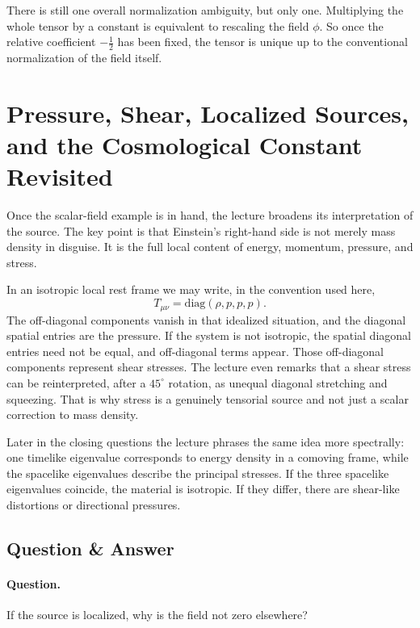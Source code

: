 There is still one overall normalization ambiguity, but only one. Multiplying the whole tensor by a constant is equivalent to rescaling the field \(\phi\). So once the relative coefficient \(-\frac12\) has been fixed, the tensor is unique up to the conventional normalization of the field itself.

\section{Pressure, Shear, Localized Sources, and the Cosmological Constant Revisited}

Once the scalar-field example is in hand, the lecture broadens its interpretation of the source. The key point is that Einstein's right-hand side is not merely mass density in disguise. It is the full local content of energy, momentum, pressure, and stress.

In an isotropic local rest frame we may write, in the convention used here,
\begin{equation}
T_{\mu\nu}=\mathrm{diag}(\rho,p,p,p).
\end{equation}
The off-diagonal components vanish in that idealized situation, and the diagonal spatial entries are the pressure. If the system is not isotropic, the spatial diagonal entries need not be equal, and off-diagonal terms appear. Those off-diagonal components represent shear stresses. The lecture even remarks that a shear stress can be reinterpreted, after a \(45^\circ\) rotation, as unequal diagonal stretching and squeezing. That is why stress is a genuinely tensorial source and not just a scalar correction to mass density.

Later in the closing questions the lecture phrases the same idea more spectrally: one timelike eigenvalue corresponds to energy density in a comoving frame, while the spacelike eigenvalues describe the principal stresses. If the three spacelike eigenvalues coincide, the material is isotropic. If they differ, there are shear-like distortions or directional pressures.

\subsection{Question \& Answer}

\paragraph{Question.} If the source is localized, why is the field not zero elsewhere?

